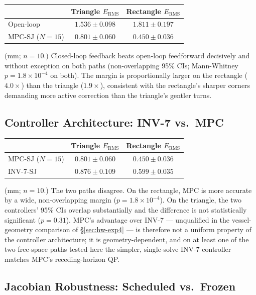 \documentclass[journal]{IEEEtran}
\begin{document}
\begin{center}
\begin{tabular}{@{}lcc@{}}
\toprule
& Triangle $E_{\mathrm{RMS}}$ & Rectangle $E_{\mathrm{RMS}}$ \\
\midrule
Open-loop & $1.536\pm0.098$ & $1.811\pm0.197$ \\
MPC-SJ ($N{=}15$) & $0.801\pm0.060$ & $0.450\pm0.036$ \\
\bottomrule
\end{tabular}
\end{center}
(mm; $n=10$.) Closed-loop feedback beats open-loop feedforward
decisively and without exception on both paths (non-overlapping 95\%
CIs; Mann-Whitney $p=1.8\times10^{-4}$ on both). The margin is
proportionally larger on the rectangle ($4.0\times$) than the triangle
($1.9\times$), consistent with the rectangle's sharper corners
demanding more active correction than the triangle's gentler turns.

\subsection{Controller Architecture: INV-7 vs.\ MPC}
\label{sec:shape-exp2}

\begin{center}
\begin{tabular}{@{}lcc@{}}
\toprule
& Triangle $E_{\mathrm{RMS}}$ & Rectangle $E_{\mathrm{RMS}}$ \\
\midrule
MPC-SJ ($N{=}15$) & $0.801\pm0.060$ & $0.450\pm0.036$ \\
INV-7-SJ & $0.876\pm0.109$ & $0.599\pm0.035$ \\
\bottomrule
\end{tabular}
\end{center}
(mm; $n=10$.) The two paths disagree. On the rectangle, MPC is more
accurate by a wide, non-overlapping margin ($p=1.8\times10^{-4}$). On
the triangle, the two controllers' 95\% CIs overlap substantially and
the difference is not statistically significant
($p=0.31$). MPC's advantage over INV-7 --- unqualified in the
vessel-geometry comparison of \S\ref{sec:hw-exp4} --- is therefore not a
uniform property of the controller architecture; it is geometry-dependent,
and on at least one of the two free-space paths tested here the simpler,
single-solve INV-7 controller matches MPC's receding-horizon QP.

\subsection{Jacobian Robustness: Scheduled vs.\ Frozen}
\label{sec:shape-exp3}
\end{document}

